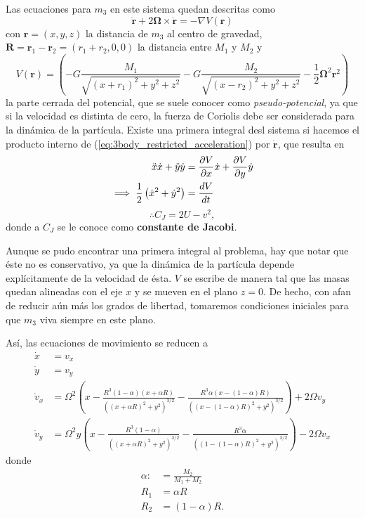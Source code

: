 Las ecuaciones para $m_3$ en este sistema quedan descritas como
\begin{equation}
 \ddot{\mathbf{r}} + 2\mathbf{\Omega} \times \dot{\mathbf{r}} = - \nabla V(\mathbf{r})
 \label{eq:3body_restricted_acceleration}
\end{equation}
con $\mathbf{r} = (x,y,z)$ la distancia de $m_3$ al centro de gravedad, $\mathbf{R} = \mathbf{r}_1 - \mathbf{r}_2 = (r_1 + r_2,0,0)$ la distancia entre $M_1$ y $M_2$ y
\begin{equation}
 V(\mathbf{r}) = \left( -G \frac{M_1}{\sqrt{(x + r_1)^2 + y^2 + z^2}} - G \frac{M_2}{\sqrt{(x - r_2)^2 + y^2 + z^2}} - \frac{1}{2} \mathbf{\Omega}^2 \mathbf{r}^2 \right)
 \label{eq:3body_restricted_potential}
\end{equation} 
la parte cerrada del potencial, que se suele conocer como \textit{pseudo-potencial}, ya que si la velocidad es distinta de cero, la fuerza de Coriolis debe ser considerada para la dinámica de la partícula.
Existe una primera integral desl sistema si hacemos el producto interno de (\ref{eq:3body_restricted_acceleration}) por $\dot{\mathbf{r}}$, que resulta en 
\begin{align*}
 \ddot{x} \dot{x} + \ddot{y} \dot{y} &= \frac{\partial V}{\partial x}\dot{x} + \frac{\partial V}{\partial y} \dot{y} \\
 \implies \frac{1}{2} \left( \dot{x}^2 + \dot{y}^2 \right) &= \frac{d V}{dt} 
\end{align*}
\begin{equation}
 \therefore C_J = 2U - v^2,
 \label{eq:3body_jacobi_constant}
\end{equation}
donde a $C_J$ se le conoce como \textbf{constante de Jacobi}.

Aunque se pudo encontrar una primera integral al problema, hay que notar que éste no es conservativo, ya que la dinámica de la partícula depende explícitamente de la velocidad de ésta. $V$ se escribe de manera tal que las masas quedan alineadas con el eje $x$ y se mueven en el plano $z = 0$. De hecho, con afan de reducir aún más los grados de libertad, tomaremos condiciones iniciales para que $m_3$ viva siempre en este plano.

Así, las ecuaciones de movimiento se reducen a
\begin{align}
 \dot{x} &= v_x \\
 \dot{y} &= v_y \\
 \dot{v}_x &= \Omega^2 \left( x - \frac{ R^3 (1 - \alpha) (x+\alpha R) }{\left( (x+\alpha R)^2 + y^2 \right)^{3/2} } - \frac{ R^3 \alpha (x- (1 -\alpha) R) }{\left( (x - (1-\alpha) R)^2 + y^2 \right)^{3/2} } \right) + 2\Omega v_y \\ 
 \dot{v}_y &= \Omega^2 y \left( x - \frac{ R^3 (1 - \alpha) }{\left( (x+\alpha R)^2 + y^2 \right)^{3/2} } - \frac{ R^3 \alpha }{\left( (1 - (1-\alpha) R)^2 + y^2 \right)^{3/2} } \right) - 2\Omega v_x
\end{align}
donde
\begin{align*}
 \alpha :&= \frac{M_2}{M_1 + M_2} \\ 
 R_1 &= \alpha R \\
 R_2 &= (1 - \alpha) R.
\end{align*}

